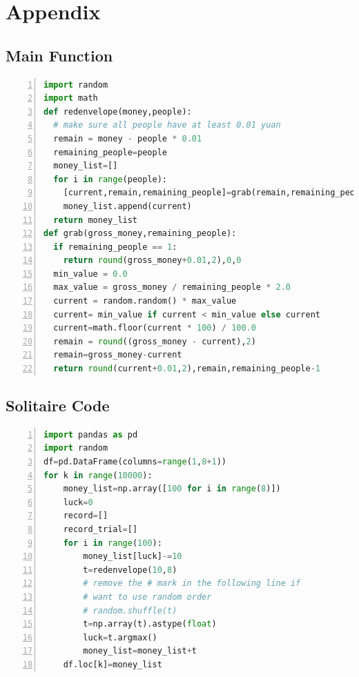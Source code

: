\documentclass{scrartcl}
\begin{document}


\printbibliography{}
\newpage

\appendix
\section{Appendix}\label{appendix1}
\subsection{Main Function}
\begin{lstlisting}[language = Python,title={main.py},  numbers=left, 
    numberstyle=\tiny,keywordstyle=\color{blue!70},
    commentstyle=\color{red!50!green!50!blue!50},frame=shadowbox,
    rulesepcolor=\color{red!20!green!20!blue!20},basicstyle=\ttfamily]
import random
import math
def redenvelope(money,people):
  # make sure all people have at least 0.01 yuan
  remain = money - people * 0.01
  remaining_people=people
  money_list=[]
  for i in range(people):
    [current,remain,remaining_people]=grab(remain,remaining_people)
    money_list.append(current)
  return money_list
def grab(gross_money,remaining_people):
  if remaining_people == 1:
    return round(gross_money+0.01,2),0,0
  min_value = 0.0
  max_value = gross_money / remaining_people * 2.0
  current = random.random() * max_value
  current= min_value if current < min_value else current
  current=math.floor(current * 100) / 100.0
  remain = round((gross_money - current),2)
  remain=gross_money-current
  return round(current+0.01,2),remain,remaining_people-1
\end{lstlisting}
\subsection{Solitaire Code}\label{appendix2}
\begin{lstlisting}[language = Python,title={solitaire.py},  numbers=left, 
    numberstyle=\tiny,keywordstyle=\color{blue!70},
    commentstyle=\color{red!50!green!50!blue!50},frame=shadowbox,
    rulesepcolor=\color{red!20!green!20!blue!20},basicstyle=\ttfamily]
import pandas as pd
import random
df=pd.DataFrame(columns=range(1,8+1))
for k in range(10000):
    money_list=np.array([100 for i in range(8)])
    luck=0
    record=[]
    record_trial=[]
    for i in range(100):
        money_list[luck]-=10
        t=redenvelope(10,8)
        # remove the # mark in the following line if 
        # want to use random order
        # random.shuffle(t)
        t=np.array(t).astype(float)
        luck=t.argmax()
        money_list=money_list+t
    df.loc[k]=money_list
\end{lstlisting}
\end{document}
